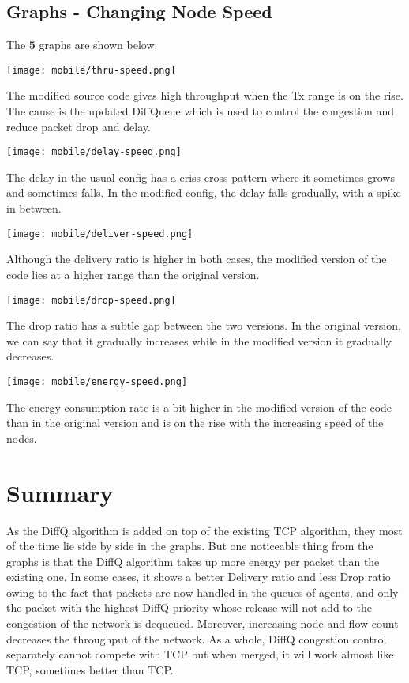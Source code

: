 \documentclass{article}
\begin{document}
\subsection{Graphs - Changing Node Speed}
The \textbf{5} graphs are shown below:

\begin{center}
    \texttt{[image: mobile/thru-speed.png]}
\end{center}

The modified source code gives high throughput when the Tx range is on the rise. The cause is the updated DiffQueue which is used to control the congestion and reduce packet drop and delay.

\begin{center}
    \texttt{[image: mobile/delay-speed.png]}
\end{center}

The delay in the usual config has a criss-cross pattern where it sometimes grows and sometimes falls. In the modified config, the delay falls gradually, with a spike in between.

\begin{center}
    \texttt{[image: mobile/deliver-speed.png]}
\end{center}

Although the delivery ratio is higher in both cases, the modified version of the code lies at a higher range than the original version.

\begin{center}
    \texttt{[image: mobile/drop-speed.png]}
\end{center}

The drop ratio has a subtle gap between the two versions. In the original version, we can say that it gradually increases while in the modified version it gradually decreases.

\begin{center}
    \texttt{[image: mobile/energy-speed.png]}
\end{center}

The energy consumption rate is a bit higher in the modified version of the code than in the original version and is on the rise with the increasing speed of the nodes.

\section{Summary}
As the DiffQ algorithm is added on top of the existing TCP algorithm, they most of the time lie side by side in the graphs. But one noticeable thing from the graphs is that the DiffQ algorithm takes up more energy per packet than the existing one. In some cases, it shows a better Delivery ratio and less Drop ratio owing to the fact that packets are now handled in the queues of agents, and only the packet with the highest DiffQ priority whose release will not add to the congestion of the network is dequeued. Moreover, increasing node and flow count decreases the throughput of the network. As a whole, DiffQ congestion control separately cannot compete with TCP but when merged, it will work almost like TCP, sometimes better than TCP.
\end{document}
